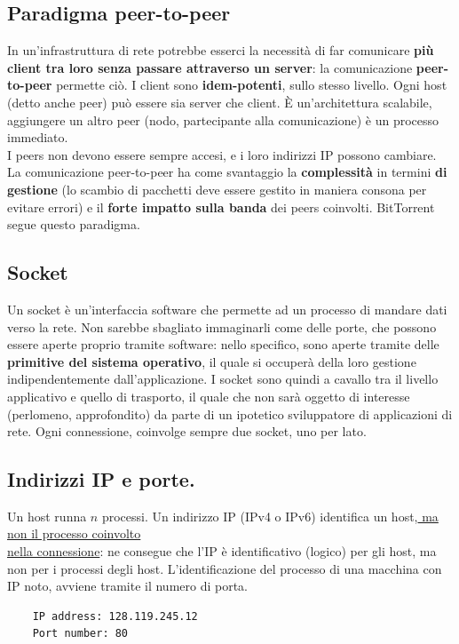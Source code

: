 \subsection{Paradigma peer-to-peer}
In un'infrastruttura di rete potrebbe esserci la necessità di far comunicare \textbf{più client tra loro senza passare attraverso un server}: la comunicazione \textbf{peer-to-peer} permette ciò. I client sono \textbf{idem-potenti}, sullo stesso livello. Ogni host (detto anche peer) può essere sia server che client.
È un'architettura scalabile, aggiungere un altro peer (nodo, partecipante alla comunicazione) è un processo immediato.\\
I peers non devono essere sempre accesi, e i loro indirizzi IP possono cambiare.\\
La comunicazione peer-to-peer ha come svantaggio la \textbf{complessità} in termini \textbf{di gestione} (lo scambio di pacchetti deve essere gestito in maniera consona per evitare errori) e il \textbf{forte impatto sulla banda} dei peers coinvolti. BitTorrent segue questo paradigma.

\subsection{Socket}
Un socket è un'interfaccia software che permette ad un processo di mandare dati verso la rete. Non sarebbe sbagliato immaginarli come delle porte, che possono essere aperte proprio tramite software: nello specifico, sono aperte tramite delle \textbf{primitive del sistema operativo}, il quale si occuperà della loro gestione indipendentemente dall'applicazione. I socket sono quindi a cavallo tra il livello applicativo e quello di trasporto, il quale che non sarà oggetto di interesse (perlomeno, approfondito) da parte di un ipotetico sviluppatore di applicazioni di rete. Ogni connessione, coinvolge sempre due socket, uno per lato.

\newpage

\subsection{Indirizzi IP e porte.}
Un host runna $n$ processi. Un indirizzo IP (IPv4 o IPv6) identifica un host,\underline{ ma non il processo coinvolto}\\ \underline{nella connessione}: ne consegue che l'IP è identificativo (logico) per gli host, ma non per i processi degli host.
L'identificazione del processo di una macchina con IP noto, avviene tramite il numero di porta. 
\begin{verbatim}
    IP address: 128.119.245.12
    Port number: 80
\end{verbatim}


